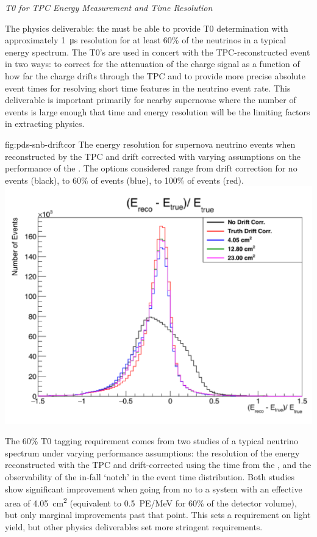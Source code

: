 \textit{T0 for TPC Energy Measurement and Time Resolution}

The physics deliverable: the  must be able to provide T0 determination with approximately \SI{1}{\micro s} resolution for at least 60\% of the neutrinos in a typical  energy spectrum. The T0's are used in concert with the TPC-reconstructed event in two ways: to correct for the attenuation of the charge signal as a function of how far the charge drifts through the TPC and to provide more precise absolute event times for resolving short time features in the  neutrino event rate. This deliverable is important primarily for nearby supernovae where the number of events is large enough that time and energy resolution will be the limiting factors in extracting physics. 

\begin{dunefigure}
{fig:pds-snb-driftcor}
{The energy resolution for supernova neutrino events when reconstructed by the TPC and drift corrected with varying assumptions on the performance of the . The options considered range from drift correction for no events (black), to 60\% of events (blue), to 100\% of events (red).}
  \includegraphics[width=0.4\columnwidth]{graphics/pd-snb-tpc-eres}
\end{dunefigure}

The 60\% T0 tagging requirement comes from two studies of a typical  neutrino spectrum under varying  performance assumptions: the resolution of the energy reconstructed with the TPC and drift-corrected using the time from the , and the observability of the in-fall `notch' in the  event time distribution. Both studies show significant improvement when going from no  to a system with an effective area of \SI{4.05}{cm^2} (equivalent to \SI{0.5}{PE/MeV} for 60\% of the detector volume), but only marginal improvements past that point. This sets a requirement on light yield, but other physics deliverables set more stringent requirements.


